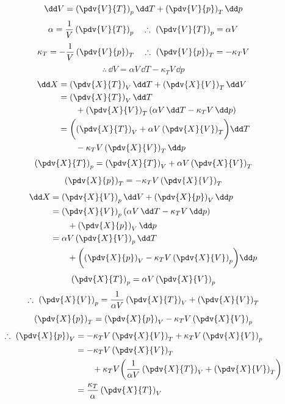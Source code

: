 \[ \dd V=\left(\pdv{V}{T}\right)_{p}\dd T+\left(\pdv{V}{p}\right)_{T}\dd p \]
\[ \alpha=\frac{1}{V}\left(\pdv{V}{T}\right)_{p} \quad \therefore\ \left(\pdv{V}{T}\right)_{p}=\alpha V \]
\[ \kappa_{T}=-\frac{1}{V}\left(\pdv{V}{p}\right)_{T} \quad \therefore\ \left(\pdv{V}{p}\right)_{T}=-\kappa_{T}V \]
\[ \therefore\ \dd V=\alpha V\,\dd T-\kappa_{T}V\,\dd p \]
\begin{align*}
\dd X&=\left(\pdv{X}{T}\right)_{V}\dd T+\left(\pdv{X}{V}\right)_{T}\dd V\\
&=\left(\pdv{X}{T}\right)_{V}\dd T\\
&\qquad+\left(\pdv{X}{V}\right)_{T}(\alpha V\,\dd T-\kappa_{T}V\,\dd p)\\
&=\biggl(\left(\pdv{X}{T}\right)_{V}+\alpha V\left(\pdv{X}{V}\right)_{T}\biggr)\dd T\\
&\qquad-\kappa_{T}V\left(\pdv{X}{V}\right)_{T}\dd p
\end{align*}
\[ \left(\pdv{X}{T}\right)_{p}=\left(\pdv{X}{T}\right)_{V}+\alpha V\left(\pdv{X}{V}\right)_{T} \]
\[ \left(\pdv{X}{p}\right)_{T}=-\kappa_{T}V\left(\pdv{X}{V}\right)_{T} \]
\begin{align*}
\dd X&=\left(\pdv{X}{V}\right)_{p}\dd V+\left(\pdv{X}{p}\right)_{V}\dd p\\
&=\left(\pdv{X}{V}\right)_{p}(\alpha V\,\dd T-\kappa_{T}V\,\dd p)\\
&\qquad+\left(\pdv{X}{p}\right)_{V}\dd p\\
&=\alpha V\left(\pdv{X}{V}\right)_{p}\dd T\\
&\qquad+\biggl(\left(\pdv{X}{p}\right)_{V}-\kappa_{T}V\left(\pdv{X}{V}\right)_{p}\biggr)\dd p
\end{align*}
\[ \left(\pdv{X}{T}\right)_{p}=\alpha V\left(\pdv{X}{V}\right)_{p} \]
\[ \therefore\ \left(\pdv{X}{V}\right)_{p}=\frac{1}{\alpha V}\left(\pdv{X}{T}\right)_{V}+\left(\pdv{X}{V}\right)_{T} \]
\[ \left(\pdv{X}{p}\right)_{T}=\left(\pdv{X}{p}\right)_{V}-\kappa_{T}V\left(\pdv{X}{V}\right)_{p} \]
\begin{align*}
\therefore\ \left(\pdv{X}{p}\right)_{V}&=-\kappa_{T}V\left(\pdv{X}{V}\right)_{T}+\kappa_{T}V\left(\pdv{X}{V}\right)_{p}\\
&=-\kappa_{T}V\left(\pdv{X}{V}\right)_{T}\\
&\qquad+\kappa_{T}V\biggl(\frac{1}{\alpha V}\left(\pdv{X}{T}\right)_{V}+\left(\pdv{X}{V}\right)_{T}\biggr)\\
&=\frac{\kappa_{T}}{\alpha}\left(\pdv{X}{T}\right)_{V}
\end{align*}
